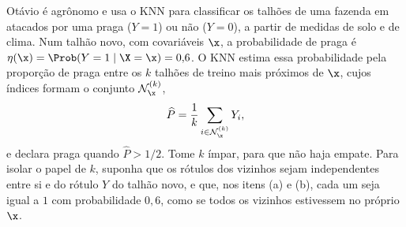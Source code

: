 Otávio é agrônomo e usa o KNN para classificar os talhões de uma fazenda em atacados por uma
praga ($Y=1$) ou não ($Y=0$), a partir de medidas de solo e de clima. Num talhão novo, com
covariáveis $\x$, a probabilidade de praga é $\eta(\x)=\Prob(Y=1\mid\X=\x)=0{,}6$. O KNN
estima essa probabilidade pela proporção de praga entre os $k$ talhões de treino mais
próximos de $\x$, cujos índices formam o conjunto $\mathcal{N}_{\x}^{(k)}$,
\[
  \widehat P=\frac1k\sum_{i\in\mathcal{N}_{\x}^{(k)}}Y_i ,
\]
e declara praga quando $\widehat P>1/2$. Tome $k$ ímpar, para que não haja empate. Para
isolar o papel de $k$, suponha que os rótulos dos vizinhos sejam independentes entre si e
do rótulo $Y$ do talhão novo, e que, nos itens (a) e (b), cada um seja igual a $1$ com
probabilidade $0{,}6$, como se todos os vizinhos estivessem no próprio $\x$.
